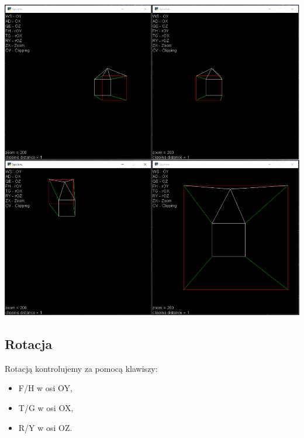 \documentclass[12pt]{article}
\begin{document}
\begin{center}
    \noindent\includegraphics[scale=0.5]{spolens tra.png}
\end{center}

\newpage
\subsection{Rotacja}
Rotacją kontrolujemy za pomocą klawiszy:
\begin{itemize}
    \item F/H w osi OY,
    \item T/G w osi OX,
    \item R/Y w osi OZ.
\end{itemize}
\end{document}
